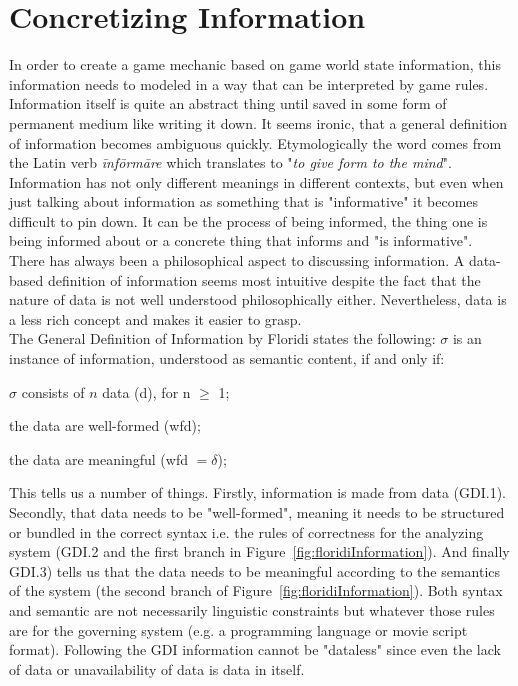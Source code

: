 \section{Concretizing Information}
In order to create a game mechanic based on game world state information, this information needs to modeled in a way that can be interpreted by game rules. Information itself is quite an abstract thing until saved in some form of permanent medium like writing it down. It seems ironic, that a general definition of information becomes ambiguous quickly. Etymologically the word comes from the Latin verb \textit{\={i}nf\={o}rm\={a}re} which translates to "\textit{to give form to the mind}". Information has not only different meanings in different contexts, but even when just talking about information as something that is "informative" it becomes difficult to pin down. It can be the process of being informed, the thing one is being informed about or a concrete thing that informs and "is informative".~\cite{Buckland1991}\\
There has always been a philosophical aspect to discussing information. A data-based definition of information seems most intuitive despite the fact that the nature of data is not well understood philosophically either. Nevertheless, data is a less rich concept and makes it easier to grasp.\\
The General Definition of Information by Floridi states the following:
\vspace*{0.5cm}
 $\sigma$ is an instance of information, understood as semantic content, if and only if:\par
{} $\sigma$ consists of $n$ data (d), for n $\geq$ 1;\par
{} the data are well-formed (wfd);\par
{} the data are meaningful (wfd $= \delta$);\par
\vspace*{0.5cm}
This tells us a number of things. Firstly, information is made from data (GDI.1). Secondly, that data needs to be "well-formed", meaning it needs to be structured or bundled in the correct syntax i.e. the rules of correctness for the analyzing system (GDI.2 and the first branch in Figure~\ref{fig:floridiInformation}). And finally GDI.3) tells us that the data needs to be meaningful according to the semantics of the system (the second branch of Figure~\ref{fig:floridiInformation}). Both syntax and semantic are not necessarily linguistic constraints but whatever those rules are for the governing system (e.g. a programming language or movie script format). Following the GDI information cannot be "dataless" since even the lack of data or unavailability of data is data in itself.~\cite{Floridi2010}\\
